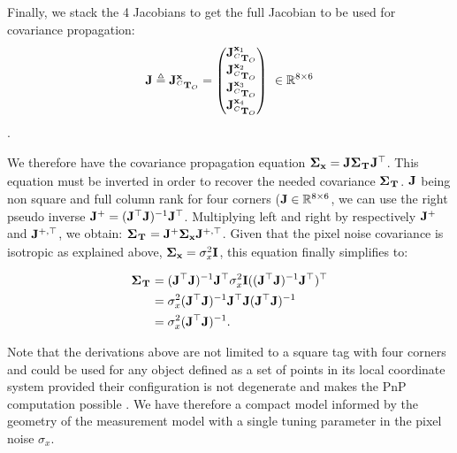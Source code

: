 Finally, we stack the 4 Jacobians to get the full Jacobian to be used for covariance propagation:
%
\begin{equation}
    {\bf J} \triangleq {\bf J}^{{\bf x}}_{\prescript{C}{}{{\bf T}}_{O}}=
    \begin{pmatrix}
    {\bf J}^{{\bf x}_1}_{\prescript{C}{}{{\bf T}}_{O}} \\ 
    {\bf J}^{{\bf x}_2}_{\prescript{C}{}{{\bf T}}_{O}} \\ 
    {\bf J}^{{\bf x}_3}_{\prescript{C}{}{{\bf T}}_{O}} \\ 
    {\bf J}^{{\bf x}_4}_{\prescript{C}{}{{\bf T}}_{O}}
    \end{pmatrix}
    ~ \in \mathbb{R}^{8 \times 6}
\end{equation}.

We therefore have the covariance propagation equation ${\bm \Sigma}_{{\bf x}} = {\bf J} {\bm \Sigma}_{\prescript{}{}{{\bf T}}_{}} {\bf J}^{\top}$. 
This equation must be inverted in order to recover the needed covariance ${\bm \Sigma}_{\prescript{}{}{{\bf T}}_{}}$. ${\bf J}$ being non square and full column rank for four 
corners (${\bf J} \in \mathbb{R}^{8 \times 6}$, we can use the right pseudo inverse ${\bf J}^{+} = ({\bf J}^{\top} {\bf J})^{-1}{\bf J}^{\top}$. Multiplying left and right by 
respectively ${\bf J}^{+}$ and ${\bf J}^{+,\top}$, we obtain: ${\bm \Sigma}_{\prescript{}{}{{\bf T}}_{}} = {\bf J}^{+} {\bm \Sigma}_{{\bf x}} {\bf J}^{+,\top}$. Given that the pixel noise covariance is 
isotropic as explained above, ${\bm \Sigma}_{{\bf x}} = \sigma_x^2 {\bf I}$, this equation finally simplifies to:

\begin{align}
    {\bm \Sigma}_{\prescript{}{}{{\bf T}}_{}} 
    &=  ({\bf J}^{\top} {\bf J})^{-1}{\bf J} ^{\top} \sigma_x^2 {\bf I} (({\bf J}^{\top} {\bf J})^{-1}{\bf J}^{\top})^{\top} \\
    &=  \sigma_x^2 ({\bf J}^{\top} {\bf J})^{-1} {\bf J}^{\top} {\bf J} ({\bf J}^{\top} {\bf J})^{-1} \\
    &= \sigma_{x}^2({\bf J}^{\top} {\bf J})^{-1}.
\end{align}

Note that the derivations above are not limited to a square tag with four corners and could be used for any object defined as
a set of points in its local coordinate system provided their configuration is not degenerate and makes the PnP computation possible \cite{gao2003complete}.  
We have therefore a compact model informed by the geometry of the measurement model with a single tuning parameter in the pixel noise $\sigma_x$.



